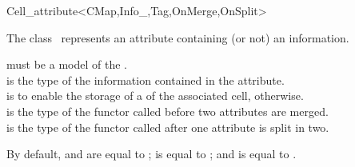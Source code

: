 \ccRefPageBegin
\begin{ccRefClass}{Cell_attribute<CMap,Info_,Tag,OnMerge,OnSplit>}


\ccDefinition
  
The class \ccRefName\ represents an attribute containing (or not) an information.

\ccIsModel
{}

\ccParameters
{} must be a model of the .\\
 is the type of the information contained in the attribute.\\
 is  to enable the storage of a
    of the associated cell,  otherwise.\\
 is the type of the functor called before two attributes are merged.\\
 is the type of the functor called after one attribute is split in two. 

   By default,  and  are equal to
   ;  is equal to
   ; and  is equal to .

\ccTypes
{}
\ccGlue
{}
\ccGlue
{}
\ccGlue
{}


\end{ccRefClass}

